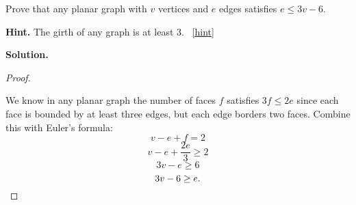 \documentclass{book}
\begin{document}
\setcounter{project}{30}
\addtocounter{project}{-1}
\begin{activity}[]\label{activity-25}
\hypertarget{p-307}{}%
Prove that any planar graph with \(v\) vertices and \(e\) edges satisfies \(e \le 3v - 6\).%
\par\smallskip%
\noindent\textbf{Hint.}\hypertarget{hint-9}{}\quad%
\hypertarget{p-308}{}%
The girth of any graph is at least 3.%
~\hfill{\tiny\hyperlink{a-30}{[hint]}\hypertarget{q-30}{}}\par\smallskip%
\noindent\textbf{Solution.}\hypertarget{solution-22}{}\quad%
\begin{proof}\hypertarget{proof-3}{}
\hypertarget{p-309}{}%
We know in any planar graph the number of faces \(f\) satisfies \(3f \le 2e\) since each face is bounded by at least three edges, but each edge borders two faces. Combine this with Euler's formula:%
\begin{equation*}
v - e + f = 2
\end{equation*}
%
\begin{equation*}
v - e + \frac{2e}{3} \ge 2
\end{equation*}
%
\begin{equation*}
3v - e \ge 6
\end{equation*}
%
\begin{equation*}
3v - 6 \ge e.\qedhere
\end{equation*}
%
\end{proof}
\end{activity}

\clearpage
\end{document}
